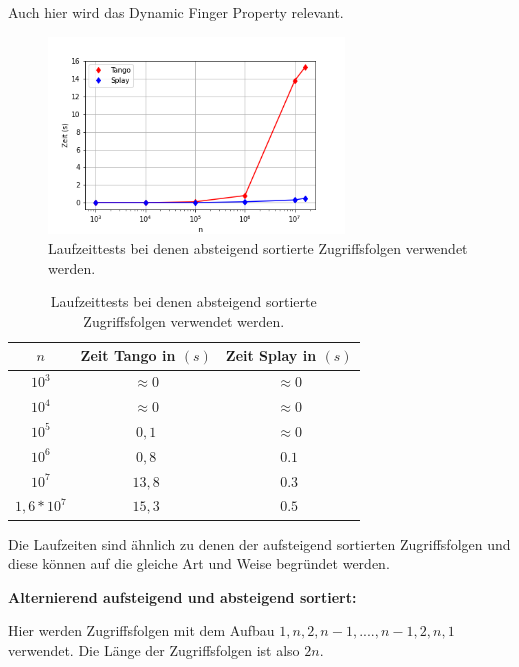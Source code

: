 \documentclass[a4paper,12pt]{article}
\begin{document}
\bigskip


\noindent Auch hier wird das Dynamic Finger Property relevant. 
\begin{figure}[H]
	\centering
	\includegraphics[width=0.7\textwidth]{Medien/laufzeittest/diagramm/sorted2}
	\caption{Laufzeittests bei denen absteigend sortierte Zugriffsfolgen verwendet werden.}
\end{figure}
\begin{table}[H]
	\begin{center}
		\begin{tabular}[c]{|c|c|c|}
			\hline
		$n$ & Zeit Tango in $\left(s\right)$ &Zeit Splay in $\left(s\right)$ \\
		\hline
		$10^3$ & $\approx 0$ &$\approx 0$ \\
		\hline
		$10^4$  & $\approx 0$ &$\approx 0$  \\
		\hline
		$10^5$  & $0,1$ &$\approx 0$  \\
		\hline
		$10^6$  & $0,8$ &$0.1$  \\
		\hline
		$10^7$  & $13,8$ &$0.3$  \\
		\hline
		$1,6 *10^7$  & $15,3$ &$0.5$  \\
		\hline
		\end{tabular}
		\caption{Laufzeittests bei denen absteigend sortierte Zugriffsfolgen verwendet werden.} 
	\end{center}
\end{table}
\noindent Die Laufzeiten sind ähnlich zu denen der aufsteigend sortierten Zugriffsfolgen und diese können auf die gleiche Art und Weise begründet werden.

 \bigskip
\noindent \textbf{Alternierend aufsteigend und absteigend sortiert:}

\bigskip
\noindent Hier werden Zugriffsfolgen mit dem Aufbau $1, n, 2, n- 1,...., n - 1, 2, n, 1$ verwendet. Die Länge der Zugriffsfolgen ist also $2n$.
\end{document}
